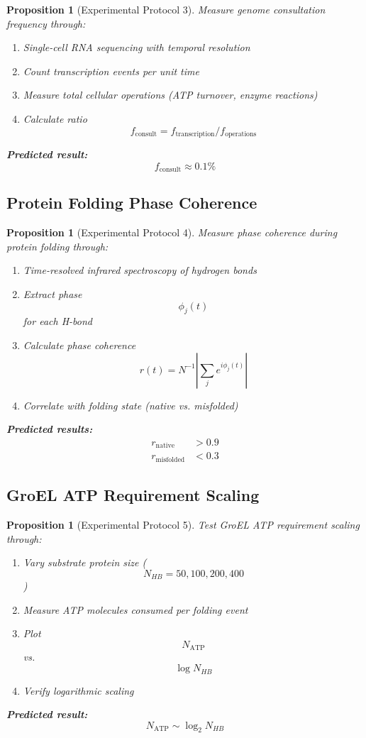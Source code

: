 \documentclass[12pt,a4paper]{article}
\newtheorem{proposition}[theorem]{Proposition}
\begin{document}
\begin{proposition}[Experimental Protocol 3]
Measure genome consultation frequency through:
\begin{enumerate}
\item Single-cell RNA sequencing with temporal resolution
\item Count transcription events per unit time
\item Measure total cellular operations (ATP turnover, enzyme reactions)
\item Calculate ratio $$f_{\text{consult}} = f_{\text{transcription}} / f_{\text{operations}}$$
\end{enumerate}

\textbf{Predicted result:}
$$
f_{\text{consult}} \approx 0.1\%
$$
\end{proposition}

\subsection{Protein Folding Phase Coherence}

\begin{proposition}[Experimental Protocol 4]
Measure phase coherence during protein folding through:
\begin{enumerate}
\item Time-resolved infrared spectroscopy of hydrogen bonds
\item Extract phase $$\phi_j(t)$$ for each H-bond
\item Calculate phase coherence $$r(t) = N^{-1} |\sum_j e^{i\phi_j(t)}|$$
\item Correlate with folding state (native vs. misfolded)
\end{enumerate}

\textbf{Predicted results:}
\begin{align}
r_{\text{native}} &> 0.9 \\
r_{\text{misfolded}} &< 0.3
\end{align}
\end{proposition}

\subsection{GroEL ATP Requirement Scaling}

\begin{proposition}[Experimental Protocol 5]
Test GroEL ATP requirement scaling through:
\begin{enumerate}
\item Vary substrate protein size ($$N_{HB} = 50, 100, 200, 400$$)
\item Measure ATP molecules consumed per folding event
\item Plot $$N_{\text{ATP}}$$ vs. $$\log N_{HB}$$
\item Verify logarithmic scaling
\end{enumerate}

\textbf{Predicted result:}
$$
N_{\text{ATP}} \sim \log_2 N_{HB}
$$
\end{proposition}
\end{document}
